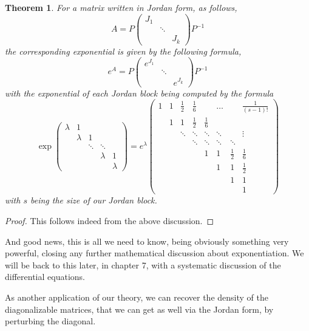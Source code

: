 \documentclass[12pt]{amsbook}
\newtheorem{theorem}{Theorem}[chapter]
\begin{document}
\begin{theorem}
For a matrix written in Jordan form, as follows,
$$A=P\begin{pmatrix}
J_1\\
&\ddots\\
&&J_k
\end{pmatrix}P^{-1}$$
the corresponding exponential is given by the following formula,
$$e^A=P\begin{pmatrix}
e^{J_1}\\
&\ddots\\
&&e^{J_k}
\end{pmatrix}P^{-1}$$
with the exponential of each Jordan block being computed by the formula
$$\exp\begin{pmatrix}
\lambda&1\\
&\lambda&1\\
&&\ddots&\ddots\\
&&&\lambda&1\\
&&&&\lambda
\end{pmatrix}
=e^{\lambda}\begin{pmatrix}
1&1&\frac{1}{2}&\frac{1}{6}&&\ldots&&\frac{1}{(s-1)!}\\
&1&1&\frac{1}{2}&\frac{1}{6}\\
&&\ddots&\ddots&\ddots&\ddots&&\vdots\\
&&&\ddots&\ddots&\ddots&\ddots\\
&&&&1&1&\frac{1}{2}&\frac{1}{6}\\
&&&&&1&1&\frac{1}{2}\\
&&&&&&1&1\\
&&&&&&&1
\end{pmatrix}$$
with $s$ being the size of our Jordan block.
\end{theorem}

\begin{proof}
This follows indeed from the above discussion.
\end{proof}

And good news, this is all we need to know, being obviously something very powerful, closing any further mathematical discussion about exponentiation. We will be back to this later, in chapter 7, with a systematic discussion of the differential equations.

\bigskip

As another application of our theory, we can recover the density of the diagonalizable matrices, that we can get as well via the Jordan form, by perturbing the diagonal.

\bigskip
\end{document}
